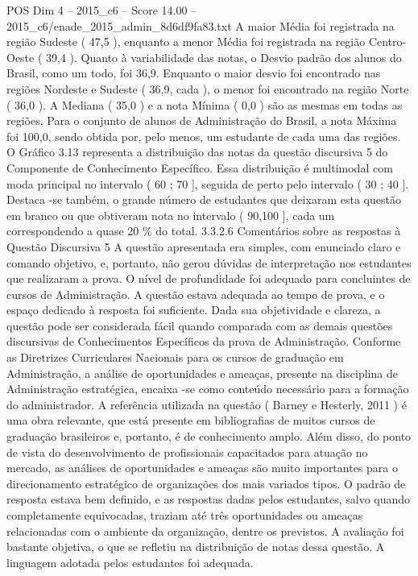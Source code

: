 \begin{textsample}{POS Dim 4 – 2015\_c6 – Score 14.00 – 2015\_c6/enade\_2015\_admin\_8d6df9fa83.txt}
A maior Média foi registrada na região Sudeste ( 47,5 ), enquanto a menor Média foi registrada na região Centro-Oeste ( 39,4 ).
Quanto à variabilidade das notas, o Desvio padrão dos alunos do Brasil, como um todo, foi 36,9.
Enquanto o maior desvio foi encontrado nas regiões Nordeste e Sudeste ( 36,9, cada ), o menor foi encontrado na região Norte ( 36,0 ).
A Mediana ( 35,0 ) e a nota Mínima ( 0,0 ) são as mesmas em todas as regiões.
Para o conjunto de alunos de Administração do Brasil, a nota Máxima foi 100,0, sendo obtida por, pelo menos, um estudante de cada uma das regiões.
O Gráfico 3.13 representa a distribuição das notas da questão discursiva 5 do Componente de Conhecimento Específico.
Essa distribuição é multimodal com moda principal no intervalo ( 60 ; 70 ], seguida de perto pelo intervalo ( 30 ; 40 ].
Destaca -se também, o grande número de estudantes que deixaram esta questão em branco ou que obtiveram nota no intervalo ( 90,100 ], cada um correspondendo a quase 20 \% do total. 3.3.2.6 Comentários sobre as respostas à Questão Discursiva 5 A questão apresentada era simples, com enunciado claro e comando objetivo, e, portanto, não gerou dúvidas de interpretação nos estudantes que realizaram a prova.
O nível de profundidade foi adequado para concluintes de cursos de Administração.
A questão estava adequada ao tempo de prova, e o espaço dedicado à resposta foi suficiente.
Dada sua objetividade e clareza, a questão pode ser considerada fácil quando comparada com as demais questões discursivas de Conhecimentos Específicos da prova de Administração.
Conforme as Diretrizes Curriculares Nacionais para os cursos de graduação em Administração, a análise de oportunidades e ameaças, presente na disciplina de Administração estratégica, encaixa -se como conteúdo necessário para a formação do administrador.
A referência utilizada na questão ( Barney e Hesterly, 2011 ) é uma obra relevante, que está presente em bibliografias de muitos cursos de graduação brasileiros e, portanto, é de conhecimento amplo.
Além disso, do ponto de vista do desenvolvimento de profissionais capacitados para atuação no mercado, as análises de oportunidades e ameaças são muito importantes para o direcionamento estratégico de organizações dos mais variados tipos.
O padrão de resposta estava bem definido, e as respostas dadas pelos estudantes, salvo quando completamente equivocadas, traziam até três oportunidades ou ameaças relacionadas com o ambiente da organização, dentre os previstos.
A avaliação foi bastante objetiva, o que se refletiu na distribuição de notas dessa questão.
A linguagem adotada pelos estudantes foi adequada.

\end{textsample}
